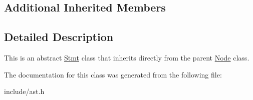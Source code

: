 \subsection*{Additional Inherited Members}


\subsection{Detailed Description}
This is an abstract \hyperlink{classfcal_1_1ast_1_1Stmt}{Stmt} class that inherits directly from the parent \hyperlink{classfcal_1_1ast_1_1Node}{Node} class. 

The documentation for this class was generated from the following file\+:\begin{DoxyCompactItemize}
\item 
include/ast.\+h\end{DoxyCompactItemize}
